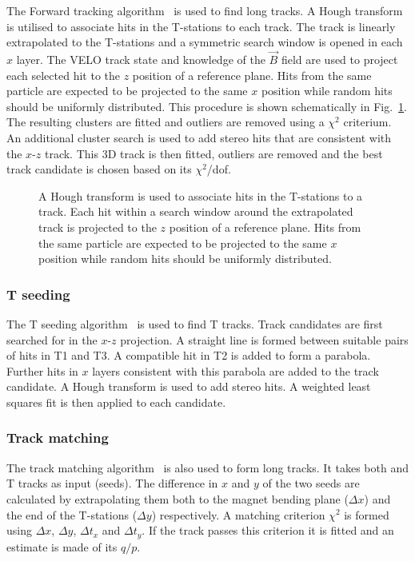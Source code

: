 The Forward tracking algorithm~\cite{patforward} is used to find long tracks. A Hough transform is utilised to associate hits in the T-stations to each \velo track. The \velo track is linearly extrapolated to the T-stations and a symmetric search window is opened in each $x$ layer. The VELO track state and knowledge of the $\vec{B}$ field are used to project each selected hit to the $z$ position of a reference plane. Hits from the same particle are expected to be projected to the same $x$ position while random hits should be uniformly distributed. This procedure is shown schematically in Fig.~\ref{fig:forward-tracking}. The resulting clusters are fitted and outliers are removed using a $\chi^{2}$ criterium. An additional cluster search is used to add stereo hits that are consistent with the $x$-$z$ track. This 3D track is then fitted, outliers are removed and the best track candidate is chosen based on its $\chi^{2}$/dof.

\begin{figure}[!htb]
  \centering
  
  \caption{A Hough transform is used to associate hits in the T-stations to a \velo track. Each hit within a search window around the extrapolated track is projected to the $z$ position of a reference plane. Hits from the same particle are expected to be projected to the same $x$ position while random hits should be uniformly distributed.}
  \label{fig:forward-tracking}
\end{figure}

\subsubsection{T seeding}
\label{sec:track:algos:seeding}

The T seeding algorithm~\cite{patseeding} is used to find T tracks. Track candidates are first searched for in the $x$-$z$ projection. A straight line is formed between suitable pairs of hits in T1 and T3. A compatible hit in T2 is added to form a parabola. Further hits in $x$ layers consistent with this parabola are added to the track candidate. A Hough transform is used to add stereo hits. A weighted least squares fit is then applied to each candidate.

\subsubsection{Track matching}
\label{sec:track:algos:match}

The track matching algorithm~\cite{patmatch} is also used to form long tracks. It takes both \velo and T tracks as input (seeds). The difference in $x$ and $y$ of the two seeds are calculated by extrapolating them both to the magnet bending plane ($\Delta x$) and the end of the T-stations ($\Delta y$) respectively. A matching criterion $\chi^{2}$ is formed using $\Delta x$, $\Delta y$, $\Delta t_{x}$ and $\Delta t_{y}$. If the track passes this criterion it is fitted and an estimate is made of its $q/p$.

